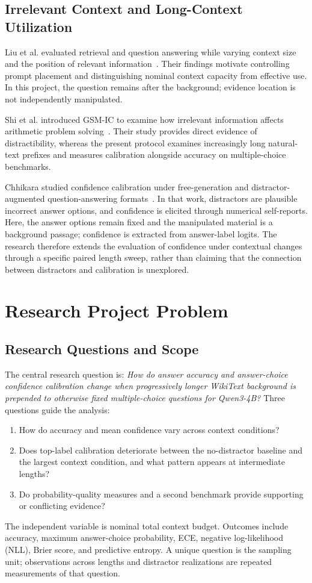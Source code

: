 \documentclass[conference]{IEEEtran}
\begin{document}
\subsection{Irrelevant Context and Long-Context Utilization}
Liu et al. evaluated retrieval and question answering while varying context size and the position of relevant information~\cite{liu2024}. Their findings motivate controlling prompt placement and distinguishing nominal context capacity from effective use. In this project, the question remains after the background; evidence location is not independently manipulated.

Shi et al. introduced GSM-IC to examine how irrelevant information affects arithmetic problem solving~\cite{shi2023}. Their study provides direct evidence of distractibility, whereas the present protocol examines increasingly long natural-text prefixes and measures calibration alongside accuracy on multiple-choice benchmarks.

Chhikara studied confidence calibration under free-generation and distractor-augmented question-answering formats~\cite{chhikara2025}. In that work, distractors are plausible incorrect answer options, and confidence is elicited through numerical self-reports. Here, the answer options remain fixed and the manipulated material is a background passage; confidence is extracted from answer-label logits. The research therefore extends the evaluation of confidence under contextual changes through a specific paired length sweep, rather than claiming that the connection between distractors and calibration is unexplored.

\section{Research Project Problem}
\subsection{Research Questions and Scope}
The central research question is: \textit{How do answer accuracy and answer-choice confidence calibration change when progressively longer WikiText background is prepended to otherwise fixed multiple-choice questions for Qwen3-4B?} Three questions guide the analysis:
\begin{enumerate}
\item How do accuracy and mean confidence vary across context conditions?
\item Does top-label calibration deteriorate between the no-distractor baseline and the largest context condition, and what pattern appears at intermediate lengths?
\item Do probability-quality measures and a second benchmark provide supporting or conflicting evidence?
\end{enumerate}
The independent variable is nominal total context budget. Outcomes include accuracy, maximum answer-choice probability, ECE, negative log-likelihood (NLL), Brier score, and predictive entropy. A unique question is the sampling unit; observations across lengths and distractor realizations are repeated measurements of that question.
\end{document}
